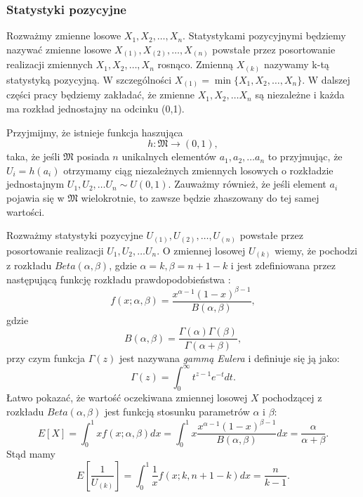\subsubsection{Statystyki pozycyjne}

Rozważmy  zmienne losowe $X_1, X_2, \dots, X_n$. Statystykami pozycyjnymi będziemy nazywać zmienne losowe  $X_{(1)}, X_{(2)}, \dots, X_{(n)}$ powstałe przez posortowanie realizacji zmiennych $X_1, X_2, \dots, X_n$ rosnąco.  Zmienną $X_{(k)}$ nazywamy k-tą statystyką pozycyjną. W szczególności $X_{(1)} = \min\{X_1, X_2, \dots, X_n \}$. W dalszej części pracy będziemy zakładać, że
zmienne $X_1, X_2, \dots X_n$ są niezależne i każda  ma rozkład jednostajny na odcinku (0,1).

Przyjmijmy, że istnieje funkcja haszująca 
\begin{equation}
    h \colon \mathfrak{M} \rightarrow (0, 1),
\end{equation}
taka, że jeśli $\mathfrak{M}$ posiada $n$ unikalnych elementów $a_1, a_2, \dots a_n$ to przyjmując, że
 $U_i = h(a_i)$ otrzymamy ciąg niezależnych zmiennych losowych o rozkładzie jednostajnym $U_1, U_2, \dots U_n \sim U(0,1)$. Zauważmy również, że jeśli element $a_i$ pojawia się w  $\mathfrak{M}$ wielokrotnie, to zawsze będzie zhaszowany do tej samej wartości.
 
Rozważmy statystyki pozycyjne  $U_{(1)}, U_{(2)}, \dots, U_{(n)}$ powstałe przez posortowanie realizacji  $U_1, U_2, \dots U_n$. O zmiennej losowej $U_{(k)}$ wiemy, że pochodzi z rozkładu $Beta(\alpha, \beta)$, gdzie $\alpha = k, \beta = n + 1 - k$ i jest zdefiniowana przez następującą funkcję rozkładu prawdopodobieństwa \cite{mincount}:
\begin{equation}
    f(x; \alpha, \beta) = \frac{x^{\alpha-1}{(1-x)}^{\beta-1}}{B(\alpha, \beta)},
\end{equation} 
gdzie $$B(\alpha, \beta) = \frac{\Gamma(\alpha)\Gamma(\beta)}{\Gamma(\alpha + \beta)},$$ przy czym funkcja $\Gamma(z)$ jest nazywana \textit{gammą Eulera} i definiuje się ją jako: $$\Gamma(z) = \int_0^\infty t^{z-1}e^{-t} dt.$$
Łatwo pokazać, że wartość oczekiwana zmiennej losowej $X$ pochodzącej z rozkładu $Beta(\alpha, \beta)$ jest funkcją stosunku parametrów $\alpha$ i $\beta$:
\begin{equation}
    E[X] = \int_0^1 xf(x; \alpha, \beta) dx = \int_0^1 x\frac{x^{\alpha-1}{(1-x)}^{\beta-1}}{B(\alpha, \beta)} dx = \frac{\alpha}{\alpha + \beta} .
\end{equation}
Stąd mamy
\begin{equation}
\label{OS-expexcation}
E[\frac{1}{U_{(k)}}] = \int_0^1 \frac{1}{x}f(x; k, n + 1 - k) dx = \frac{n}{k-1}.
\end{equation}
 
